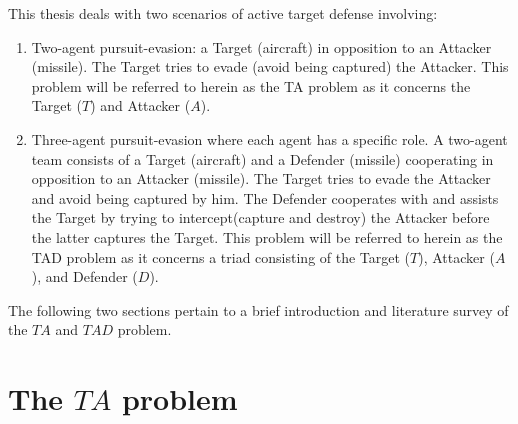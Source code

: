 % 
%
%
%

This thesis deals with two scenarios of active target defense involving:
\begin{enumerate}
	\item Two-agent pursuit-evasion: a Target (aircraft) in opposition to an Attacker (missile). The Target tries to evade (avoid being captured) the Attacker. This problem will be referred to herein as the TA problem as it concerns the Target ($T$) and Attacker ($A$).
	\item Three-agent pursuit-evasion where each agent has a specific role.
	A two-agent team consists of a Target (aircraft) and a Defender (missile) cooperating in opposition to an Attacker (missile).
	The Target tries to evade the Attacker and avoid being captured by him.
	The Defender cooperates with and assists the Target by trying to intercept(capture and destroy) the Attacker before the latter captures the Target.
	This problem will be referred to herein as the TAD problem as it concerns a triad consisting of the Target ($T$), Attacker ($A$), and Defender ($D$).
\end{enumerate}


The following two sections pertain to a brief introduction and literature survey of the $ TA $ and $ TAD $ problem.

\section{The $ TA $ problem}



